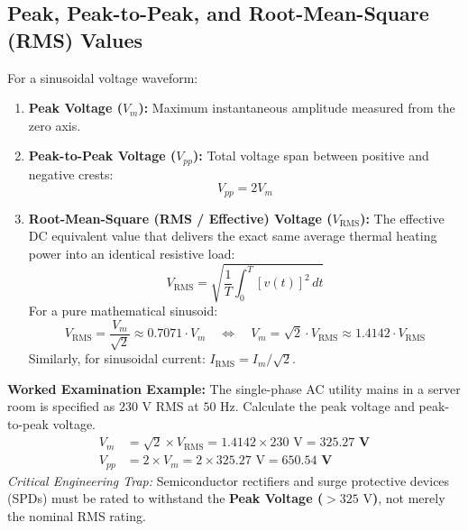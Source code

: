 \subsection{Peak, Peak-to-Peak, and Root-Mean-Square (RMS) Values}
For a sinusoidal voltage waveform:
\begin{enumerate}[label=\bfseries\arabic*.]
    \item \textbf{Peak Voltage ($V_m$):} Maximum instantaneous amplitude measured from the zero axis.
    \item \textbf{Peak-to-Peak Voltage ($V_{pp}$):} Total voltage span between positive and negative crests:
    \begin{equation}
    \label{eq:vpp}
    V_{pp} = 2 V_m
    \end{equation}
    \item \textbf{Root-Mean-Square (RMS / Effective) Voltage ($V_{\text{RMS}}$):} The effective DC equivalent value that delivers the exact same average thermal heating power into an identical resistive load:
    \begin{equation}
    \label{eq:vrms_integral}
    V_{\text{RMS}} = \sqrt{\frac{1}{T} \int_{0}^{T} [v(t)]^2\,dt}
    \end{equation}
    For a pure mathematical sinusoid:
    \begin{equation}
    \label{eq:vrms_sinusoid}
    \boxed{V_{\text{RMS}} = \frac{V_m}{\sqrt{2}} \approx 0.7071 \cdot V_m \quad \Longleftrightarrow \quad V_m = \sqrt{2} \cdot V_{\text{RMS}} \approx 1.4142 \cdot V_{\text{RMS}}}
    \end{equation}
    Similarly, for sinusoidal current: $I_{\text{RMS}} = I_m / \sqrt{2}$.
\end{enumerate}

\textbf{Worked Examination Example:} The single-phase AC utility mains in a server room is specified as $230\text{ V RMS}$ at $50\text{ Hz}$. Calculate the peak voltage and peak-to-peak voltage.
\begin{align*}
V_m &= \sqrt{2} \times V_{\text{RMS}} = 1.4142 \times 230\text{ V} = \mathbf{325.27\text{ V}} \\
V_{pp} &= 2 \times V_m = 2 \times 325.27\text{ V} = \mathbf{650.54\text{ V}}
\end{align*}
\textit{Critical Engineering Trap:} Semiconductor rectifiers and surge protective devices (SPDs) must be rated to withstand the \textbf{Peak Voltage ($>325\text{ V}$)}, not merely the nominal RMS rating.

